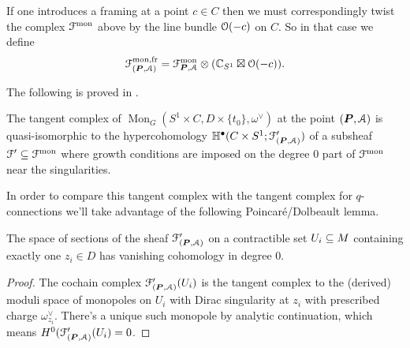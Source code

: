 \documentclass[10pt, oneside]{article}
\DeclareMathOperator{\mon}{Mon}
\begin{document}
\begin{remark}
If one introduces a framing at a point $c \in C$ then we must correspondingly twist the complex $\mathcal{F}^{\mathrm{mon}}$ above by the line bundle $\mathcal{O}(-c)$ on $C$.  So in that case we define 
\[\mathcal{F}^{\text{mon,fr}}_{(\boldsymbol{P},\mathcal{A})} = \mathcal{F}^{\mathrm{mon}}_{\boldsymbol{P}, \mathcal{A}} \otimes (\mathbb{C}_{S^1} \boxtimes \mathcal{O}(-c)).\]
\end{remark}

The following is proved in \cite{FoscoloDef}.
 
\begin{prop}
The tangent complex of $\mon_G(S^1 \times C, D \times \{t_0\}, \omega^\vee)$ at the point $(\boldsymbol{P},\mathcal{A})$ is quasi-isomorphic to the hypercohomology $\mathbb{H}^\bullet(C \times S^1; \mathcal{F}'_{(\boldsymbol{P},\mathcal{A})})$ of a subsheaf $\mathcal{F}' \subseteq \mathcal{F}^{\mathrm{mon}}$ where growth conditions are imposed on the degree 0 part of $\mathcal{F}^{\mathrm{mon}}$ near the singularities.
\end{prop}

In order to compare this tangent complex with the tangent complex for $q$-connections we'll take advantage of the following Poincar\'e/Dolbeault lemma.
\begin{lemma}
The space of sections of the sheaf $\mathcal{F}'_{(\boldsymbol{P},\mathcal{A})}$ on a contractible set $U_i \subseteq M$ containing exactly one $z_i \in D$ has vanishing cohomology in degree $0$.
\end{lemma}

\begin{proof}
The cochain complex $\mathcal{F}'_{(\boldsymbol{P},\mathcal{A})}(U_i)$ is the tangent complex to the (derived) moduli space of monopoles on $U_i$ with Dirac singularity at $z_i$ with prescribed charge $\omega^\vee_{z_i}$.  There's a unique such monopole by analytic continuation, which means $H^0(\mathcal{F}'_{(\boldsymbol{P},\mathcal{A})}(U_i)=0$.  
\end{proof}
\end{document}
